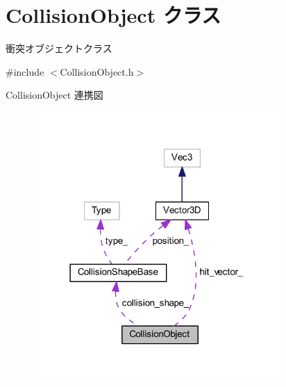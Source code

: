 \hypertarget{class_collision_object}{}\section{Collision\+Object クラス}
\label{class_collision_object}


衝突オブジェクトクラス  




{\ttfamily \#include $<$Collision\+Object.\+h$>$}



Collision\+Object 連携図\nopagebreak
\begin{figure}[H]
\begin{center}
\leavevmode
\includegraphics[width=267pt]{class_collision_object__coll__graph}
\end{center}
\end{figure}
